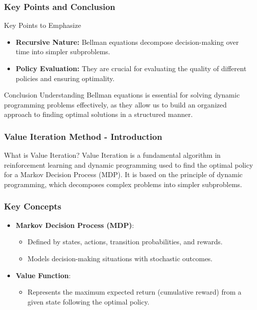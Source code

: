 \documentclass[aspectratio=169]{beamer}
\begin{document}
\begin{frame}[fragile]
    \frametitle{Key Points and Conclusion}
    \begin{block}{Key Points to Emphasize}
        \begin{itemize}
            \item \textbf{Recursive Nature:} Bellman equations decompose decision-making over time into simpler subproblems.
            \item \textbf{Policy Evaluation:} They are crucial for evaluating the quality of different policies and ensuring optimality.
        \end{itemize}
    \end{block}
    
    \begin{block}{Conclusion}
        Understanding Bellman equations is essential for solving dynamic programming problems effectively, as they allow us to build an organized approach to finding optimal solutions in a structured manner.
    \end{block}
\end{frame}

\begin{frame}[fragile]
    \frametitle{Value Iteration Method - Introduction}
    \begin{block}{What is Value Iteration?}
        Value Iteration is a fundamental algorithm in reinforcement learning and dynamic programming used to find the optimal policy for a Markov Decision Process (MDP). 
        It is based on the principle of dynamic programming, which decomposes complex problems into simpler subproblems.
    \end{block}
\end{frame}

\begin{frame}[fragile]
    \frametitle{Key Concepts}
    \begin{itemize}
        \item \textbf{Markov Decision Process (MDP)}: 
        \begin{itemize}
            \item Defined by states, actions, transition probabilities, and rewards.
            \item Models decision-making situations with stochastic outcomes.
        \end{itemize}
        \item \textbf{Value Function}: 
        \begin{itemize}
            \item Represents the maximum expected return (cumulative reward) from a given state following the optimal policy.
        \end{itemize}
    \end{itemize}
\end{frame}
\end{document}
